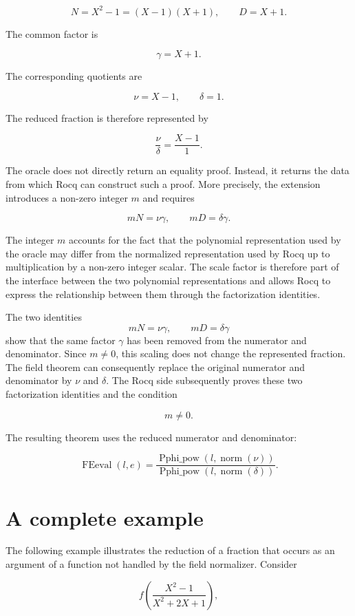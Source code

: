 \documentclass[11pt]{article}
\begin{document}
$$
  N=X^2-1=(X-1)(X+1),
  \qquad
  D=X+1.
$$

The common factor is

$$
  \gamma=X+1.
$$

The corresponding quotients are

$$
  \nu=X-1,
  \qquad
  \delta=1.
$$

The reduced fraction is therefore represented by

$$
  \frac{\nu}{\delta}
  =
  \frac{X-1}{1}.
$$

The oracle does not directly return an equality proof. Instead, it returns
the data from which Rocq can construct such a proof. More precisely, the
extension introduces a non-zero integer $m$ and requires

$$
  mN=\nu\gamma,
  \qquad
  mD=\delta\gamma.
$$

The integer $m$ accounts for the fact that the polynomial representation
used by the oracle may differ from the normalized representation used by
Rocq up to multiplication by a non-zero integer scalar. The scale factor
is therefore part of the interface between the two polynomial
representations and allows Rocq to express the relationship between them
through the factorization identities.

The two identities
\[
  mN=\nu\gamma,
  \qquad
  mD=\delta\gamma
\]
show that the same factor $\gamma$ has been removed from the numerator and
denominator. Since $m\ne0$, this scaling does not change the represented
fraction. The field theorem can consequently replace the original numerator
and denominator by $\nu$ and $\delta$.
The Rocq side subsequently proves these two factorization identities and
the condition

$$
  m\ne0.
$$

The resulting theorem uses the reduced numerator and denominator:

$$
  \operatorname{FEeval}(l,e)=
  \frac{\operatorname{Pphi\_pow}(l,\operatorname{norm}(\nu))}
       {\operatorname{Pphi\_pow}(l,\operatorname{norm}(\delta))}.
$$

\section{A complete example}

The following example illustrates the reduction of a fraction that occurs as an argument of a function not handled by the field normalizer. Consider

$$
f\left(\frac{X^2-1}{X^2+2X+1}\right),
$$
\end{document}
